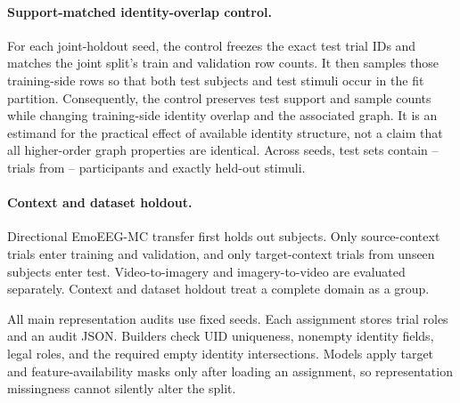 \paragraph{Support-matched identity-overlap control.}
For each joint-holdout seed, the control freezes the exact test trial IDs and
matches the joint split's train and validation row counts. It then samples those
training-side rows so that both test subjects and test stimuli occur in the fit
partition. Consequently, the control preserves test support and sample counts
while changing training-side identity overlap and the associated graph. It is
an estimand for the practical effect of available identity structure, not a
claim that all higher-order graph properties are identical.
Across seeds, test sets contain -- trials from
-- participants and exactly
 held-out stimuli.


\paragraph{Context and dataset holdout.}
Directional EmoEEG-MC transfer first holds out subjects. Only source-context
trials enter training and validation, and only target-context trials from unseen
subjects enter test. Video-to-imagery and imagery-to-video are evaluated
separately. Context and dataset holdout treat a complete domain as a group.

All main representation audits use  fixed seeds. Each assignment
stores trial roles and an audit JSON. Builders check UID uniqueness, nonempty
identity fields, legal roles, and the required empty identity intersections.
Models apply target and feature-availability masks only after loading an
assignment, so representation missingness cannot silently alter the split.

